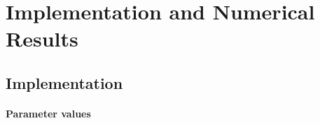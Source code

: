 \section{Implementation and Numerical Results}
\label{sec:84results}


\parbox{1em}{}
\vspace{-3em}



\disableornamentsfornextheadingtrue
\subsection{Implementation}
\label{sec:841implementation}

\paragraph{Parameter values}

